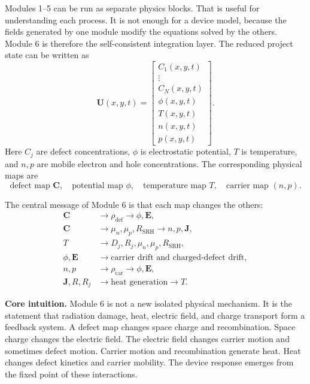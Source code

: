 \documentclass[11pt]{article}
\newcommand{\Evec}{\bm{E}}
\newcommand{\Jvec}{\bm{J}}
\newcommand{\Cvec}{\bm{C}}
\newcommand{\Uvec}{\bm{U}}
\begin{document}
Modules 1--5 can be run as separate physics blocks. That is useful for understanding each process. It is not enough for a device model, because the fields generated by one module modify the equations solved by the others. Module 6 is therefore the self-consistent integration layer. The reduced project state can be written as
\begin{equation}
\boxed{
\Uvec(x,y,t)=
\begin{bmatrix}
C_1(x,y,t) \\
\vdots \\
C_N(x,y,t) \\
\phi(x,y,t) \\
T(x,y,t) \\
n(x,y,t) \\
p(x,y,t)
\end{bmatrix}.}
\label{eq:state_vector}
\end{equation}
Here \(C_j\) are defect concentrations, \(\phi\) is electrostatic potential, \(T\) is temperature, and \(n,p\) are mobile electron and hole concentrations. The corresponding physical maps are
\begin{equation}
\boxed{
\text{defect map } \Cvec,
\quad
\text{potential map } \phi,
\quad
\text{temperature map } T,
\quad
\text{carrier map } (n,p).}
\end{equation}

The central message of Module 6 is that each map changes the others:
\begin{align}
\Cvec &\longrightarrow \rho_{\mathrm{def}} \longrightarrow \phi,\Evec, \\
\Cvec &\longrightarrow \mu_n,\mu_p,R_{\mathrm{SRH}} \longrightarrow n,p,\Jvec, \\
T &\longrightarrow D_j,R_j,\mu_n,\mu_p,R_{\mathrm{SRH}}, \\
\phi,\Evec &\longrightarrow \text{carrier drift and charged-defect drift}, \\
n,p &\longrightarrow \rho_{\mathrm{car}} \longrightarrow \phi,\Evec, \\
\Jvec, R, R_j &\longrightarrow \text{heat generation} \longrightarrow T.
\end{align}

\begin{physicsbox}
\textbf{Core intuition.} Module 6 is not a new isolated physical mechanism. It is the statement that radiation damage, heat, electric field, and charge transport form a feedback system. A defect map changes space charge and recombination. Space charge changes the electric field. The electric field changes carrier motion and sometimes defect motion. Carrier motion and recombination generate heat. Heat changes defect kinetics and carrier mobility. The device response emerges from the fixed point of these interactions.
\end{physicsbox}
\end{document}
